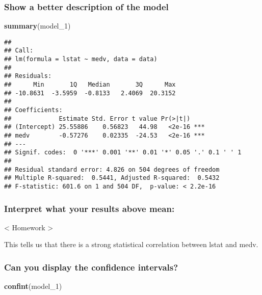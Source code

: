\documentclass[]{article}
\newenvironment{Shaded}{\begin{snugshade}}{\end{snugshade}}
\newcommand{\DecValTok}[1]{\textcolor[rgb]{0.00,0.00,0.81}{#1}}
\newcommand{\KeywordTok}[1]{\textcolor[rgb]{0.13,0.29,0.53}{\textbf{#1}}}
\newcommand{\NormalTok}[1]{#1}
\begin{document}
\hypertarget{show-a-better-description-of-the-model}{%
\subsubsection{Show a better description of the
model}\label{show-a-better-description-of-the-model}}

\begin{Shaded}
\begin{Highlighting}[]
\KeywordTok{summary}\NormalTok{(model_}\DecValTok{1}\NormalTok{)}
\end{Highlighting}
\end{Shaded}

\begin{verbatim}
## 
## Call:
## lm(formula = lstat ~ medv, data = data)
## 
## Residuals:
##      Min       1Q   Median       3Q      Max 
## -10.8631  -3.5959  -0.8133   2.4069  20.3152 
## 
## Coefficients:
##             Estimate Std. Error t value Pr(>|t|)    
## (Intercept) 25.55886    0.56823   44.98   <2e-16 ***
## medv        -0.57276    0.02335  -24.53   <2e-16 ***
## ---
## Signif. codes:  0 '***' 0.001 '**' 0.01 '*' 0.05 '.' 0.1 ' ' 1
## 
## Residual standard error: 4.826 on 504 degrees of freedom
## Multiple R-squared:  0.5441, Adjusted R-squared:  0.5432 
## F-statistic: 601.6 on 1 and 504 DF,  p-value: < 2.2e-16
\end{verbatim}

\hypertarget{interpret-what-your-results-above-mean}{%
\subsubsection{Interpret what your results above
mean:}\label{interpret-what-your-results-above-mean}}

\textless{} Homework \textgreater{}

This tells us that there is a strong statistical correlation between
lstat and medv.

\hypertarget{can-you-display-the-confidence-intervals}{%
\subsubsection{Can you display the confidence
intervals?}\label{can-you-display-the-confidence-intervals}}

\begin{Shaded}
\begin{Highlighting}[]
\KeywordTok{confint}\NormalTok{(model_}\DecValTok{1}\NormalTok{)}
\end{Highlighting}
\end{Shaded}
\end{document}
